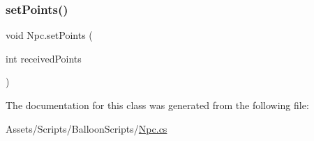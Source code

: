 \subsubsection{\texorpdfstring{set\+Points()}{setPoints()}}
{\footnotesize\ttfamily void Npc.\+set\+Points (\begin{DoxyParamCaption}\item[{int}]{received\+Points }\end{DoxyParamCaption})\hspace{0.3cm}{\ttfamily [inline]}}



The documentation for this class was generated from the following file\+:\begin{DoxyCompactItemize}
\item 
Assets/\+Scripts/\+Balloon\+Scripts/\hyperlink{Npc_8cs}{Npc.\+cs}\end{DoxyCompactItemize}
